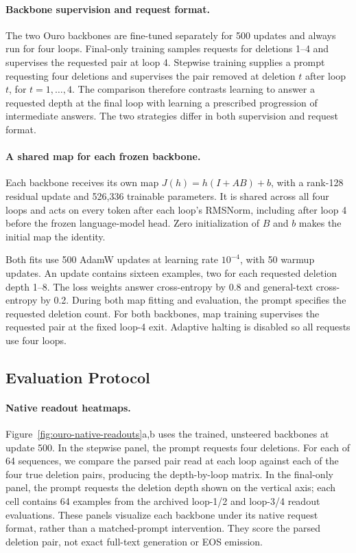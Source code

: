 \documentclass{article}
\begin{document}
\paragraph{Backbone supervision and request format.}
The two Ouro backbones are fine-tuned separately for 500 updates and always run for four loops. Final-only training samples requests for deletions 1--4 and supervises the requested pair at loop 4. Stepwise training supplies a prompt requesting four deletions and supervises the pair removed at deletion $t$ after loop $t$, for $t=1,\ldots,4$. The comparison therefore contrasts learning to answer a requested depth at the final loop with learning a prescribed progression of intermediate answers. The two strategies differ in both supervision and request format.

\paragraph{A shared map for each frozen backbone.}
Each backbone receives its own map $J(h)=h(I+AB)+b$, with a rank-128 residual update and 526,336 trainable parameters. It is shared across all four loops and acts on every token after each loop's RMSNorm, including after loop 4 before the frozen language-model head. Zero initialization of $B$ and $b$ makes the initial map the identity.

Both fits use 500 AdamW updates at learning rate $10^{-4}$, with 50 warmup updates. An update contains sixteen examples, two for each requested deletion depth 1--8. The loss weights answer cross-entropy by 0.8 and general-text cross-entropy by 0.2. During both map fitting and evaluation, the prompt specifies the requested deletion count. For both backbones, map training supervises the requested pair at the fixed loop-4 exit. Adaptive halting is disabled so all requests use four loops.

\subsection{Evaluation Protocol}
\paragraph{Native readout heatmaps.}
Figure~\ref{fig:ouro-native-readouts}a,b uses the trained, unsteered backbones at update 500. In the stepwise panel, the prompt requests four deletions. For each of 64 sequences, we compare the parsed pair read at each loop against each of the four true deletion pairs, producing the depth-by-loop matrix. In the final-only panel, the prompt requests the deletion depth shown on the vertical axis; each cell contains 64 examples from the archived loop-1/2 and loop-3/4 readout evaluations. These panels visualize each backbone under its native request format, rather than a matched-prompt intervention. They score the parsed deletion pair, not exact full-text generation or EOS emission.
\end{document}
